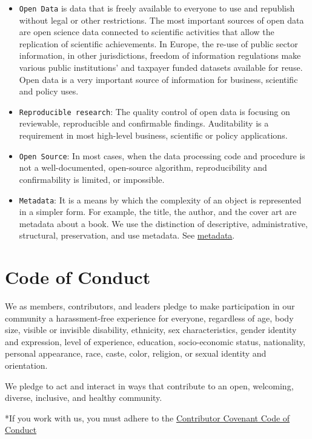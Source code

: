 \documentclass[
  fontsize=13pt,
  english,
  a4paper,
  openany, a4paper, oneside]{book}
\begin{document}
\begin{itemize}
\item
  \texttt{Open\ Data} is data that is freely available to everyone to use and republish without legal or other restrictions. The most important sources of open data are open science data connected to scientific activities that allow the replication of scientific achievements. In Europe, the re-use of public sector information, in other jurisdictions, freedom of information regulations make various public institutions' and taxpayer funded datasets available for reuse. Open data is a very important source of information for business, scientific and policy uses.
\item
  \texttt{Reproducible\ research}: The quality control of open data is focusing on reviewable, reproducible and confirmable findings. Auditability is a requirement in most high-level business, scientific or policy applications.
\item
  \texttt{Open\ Source}: In most cases, when the data processing code and procedure is not a well-documented, open-source algorithm, reproducibility and confirmability is limited, or impossible.
\item
  \texttt{Metadata}: It is a means by which the complexity of an object is represented in a simpler form. For example, the title, the author, and the cover art are metadata about a book. We use the distinction of descriptive, administrative, structural, preservation, and use metadata. See \protect\hyperlink{metadata}{metadata}.
\end{itemize}

\hypertarget{pledge}{%
\section{Code of Conduct}\label{pledge}}

We as members, contributors, and leaders pledge to make participation in our
community a harassment-free experience for everyone, regardless of age, body
size, visible or invisible disability, ethnicity, sex characteristics, gender
identity and expression, level of experience, education, socio-economic status,
nationality, personal appearance, race, caste, color, religion, or sexual identity and orientation.

We pledge to act and interact in ways that contribute to an open, welcoming,
diverse, inclusive, and healthy community.

*If you work with us, you must adhere to the \protect\hyperlink{covenant}{Contributor Covenant Code of Conduct}
\end{document}

